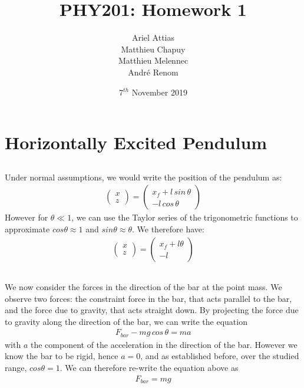 \documentclass{article}
\title{PHY201: Homework 1}
\date{7$^{th}$ November 2019}
\author{Ariel Attias\\Matthieu Chapuy\\Matthieu Melennec\\Andr\'e Renom}
\begin{document}
	\maketitle
	\tableofcontents
	\newpage

\section{Horizontally Excited Pendulum}

\subsection{} %

Under normal assumptions, we would write the position of the pendulum as:
\begin{align*}
	\left( \begin{matrix} x \\ z \end{matrix} \right) = \left( \begin{matrix}x_f +  l\, sin\,\theta \\ -l\, cos\,\theta \end{matrix} \right)
\end{align*}
However for $\theta \ll 1$, we can use the Taylor series of the trigonometric functions to approximate $cos\theta \approx 1$ and $sin\theta \approx \theta$. We therefore have:
\begin{align*}
	\left( \begin{matrix} x \\ z \end{matrix} \right) = \left( \begin{matrix}x_f +  l\theta \\ -l \end{matrix} \right)
\end{align*}

\subsection{} %

We now consider the forces in the direction of the bar at the point mass. We observe two forces: the constraint force in the bar, that acts parallel to the bar, and the force due to gravity, that acts straight down. By projecting the force due to gravity along the direction of the bar, we can write the equation
\begin{align*}
	F_{bar} - mg\,cos\,\theta = ma
\end{align*}
with $a$ the component of the acceleration in the direction of the bar. However we know the bar to be rigid, hence $a = 0$, and as established before, over the studied range, $cos\theta = 1$. We can therefore re-write the equation above as
\begin{align*}
	F_{bar} = mg
\end{align*}
\end{document}
